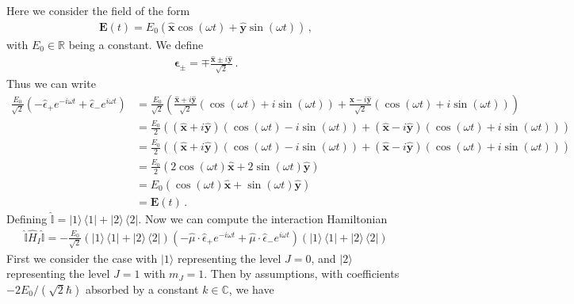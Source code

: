 \documentclass[11pt, oneside]{book}
\theoremstyle{break}
\theoremstyle{break}
\newcommand{\R}{\mathbb{R}}
\begin{document}
\chapter{}
Here we consider the field of the form 
\begin{align*}
\mathbf{E}(t) = E_0\left(\hat{\mathbf{x}}\cos(\omega t) + \hat{\mathbf{y}}\sin(\omega t) \right)\,,
\end{align*}
with $E_0\in \R$ being a constant. We define 
\begin{align*}
\mathbf{\epsilon}_{\pm} = \mp \frac{\hat{\mathbf{x}}\pm i \hat{\mathbf{y}}}{\sqrt{2}}\,.
\end{align*}
Thus we can write
\begin{align*}
\frac{E_0}{\sqrt{2}}(-\hat{\epsilon}_+ e^{-i \omega t} + \hat{\epsilon}_- e^{i \omega t}) 
&= 
\frac{E_0}{\sqrt{2}} \left( \frac{\hat{\mathbf{x}}+ i \hat{\mathbf{y}}}{\sqrt{2}}(\cos(\omega t) + i \sin(\omega t)) + \frac{\hat{\mathbf{x}}- i \hat{\mathbf{y}}}{\sqrt{2}}(\cos(\omega t) + i \sin(\omega t))\right)\\
&= 
\frac{E_0}{2} \left( (\hat{\mathbf{x}}+ i \hat{\mathbf{y}})(\cos(\omega t) - i \sin(\omega t)) + (\hat{\mathbf{x}}- i \hat{\mathbf{y}})(\cos(\omega t) + i \sin(\omega t))\right)\\
&= 
\frac{E_0}{2} \left( (\hat{\mathbf{x}}+ i \hat{\mathbf{y}})(\cos(\omega t) - i \sin(\omega t)) + (\hat{\mathbf{x}}- i \hat{\mathbf{y}})(\cos(\omega t) + i \sin(\omega t))\right)\\
&= 
\frac{E_0}{2} \left(2\cos(\omega t)\hat{\mathbf{x}}+ 2\sin(\omega t)\hat{\mathbf{y}}  \right)\\
&= 
E_0 \left(\cos(\omega t)\hat{\mathbf{x}}+ \sin(\omega t)\hat{\mathbf{y}}  \right)\\
&= \mathbf{E}(t)\,.
\end{align*}
Defining $\hat{\mathbb{I}} = |1\rangle\, \langle 1 | + |2\rangle \, \langle 2|$. Now we can compute the interaction Hamiltonian
\begin{align*}
\hat{\mathbb{I}}\hat{H}_I \hat{\mathbb{I}} = -
\frac{E_0}{\sqrt{2}}
\left(|1\rangle\, \langle 1 | + |2\rangle \, \langle 2|\right)
(-\hat{\mu}\cdot \hat{\epsilon}_+ e^{-i \omega t} + \hat{\mu}\cdot \hat{\epsilon}_- e^{i \omega t}) 
\left(|1\rangle\, \langle 1 | + |2\rangle \, \langle 2|\right)
\end{align*}
First we consider the case with $|1\rangle$ representing the level $J=0$, and $|2\rangle$ representing the level $J=1$ with $m_J = 1$. Then by assumptions, with coefficients $-2E_0/(\sqrt{2}\hbar)$ absorbed by a constant $k \in \mathbb{C}$, we have
\end{document}
